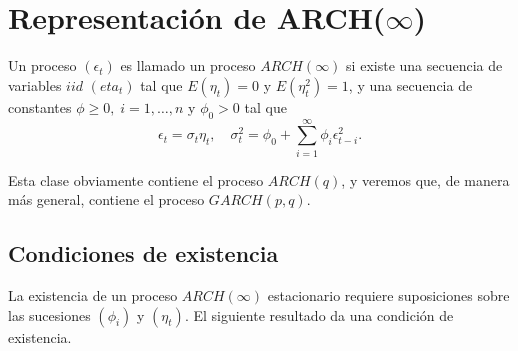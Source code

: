 \chapter{Representación de ARCH($\infty$)}

Un proceso $(\epsilon_t)$ es llamado un proceso $ARCH(\infty)$ si existe una secuencia de variables $iid$ $(eta_t)$ tal que $E(\eta_t)=0$ y $E(\eta_t^2)=1$, y una secuencia de constantes $\phi\geq 0, \; i=1,\ldots,n$ y $\phi_0>0$ tal que 
\begin{equation}
    \epsilon_t = \sigma_t \eta_t,\quad \sigma_t^2 = \phi_0 + \sum_{i=1}^\infty \phi_i \epsilon_{t-i}^2.
\end{equation}

Esta clase obviamente contiene el proceso $ARCH(q)$, y veremos que, de manera más general, contiene el proceso $GARCH(p, q)$.

\section{Condiciones de existencia}

La existencia de un proceso $ARCH(\infty)$ estacionario requiere suposiciones sobre las sucesiones $(\phi_i)$ y $(\eta_t)$. El siguiente resultado da una condición de existencia.\\

